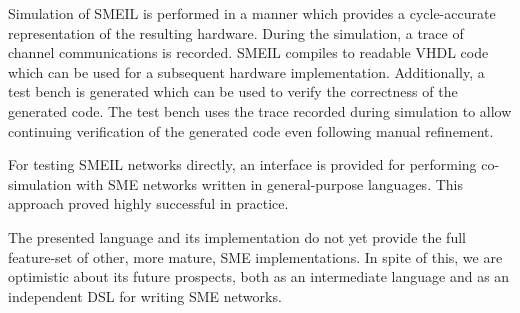 Simulation of SMEIL is performed in a manner which provides a cycle-accurate
representation of the resulting hardware. During the simulation, a trace of
channel communications is recorded. SMEIL compiles to readable VHDL code which
can be used for a subsequent hardware implementation. Additionally, a test bench
is generated which can be used to verify the correctness of the generated
code. The test bench uses the trace recorded during simulation to allow
continuing verification of the generated code even following manual refinement.

For testing SMEIL networks directly, an interface is provided for performing
co-simulation with SME networks written in general-purpose languages. This
approach proved highly successful in practice.

The presented language and its implementation do not yet provide the full
feature-set of other, more mature, SME implementations. In spite of this, we are
optimistic about its future prospects, both as an intermediate language and as
an independent DSL for writing SME networks.

